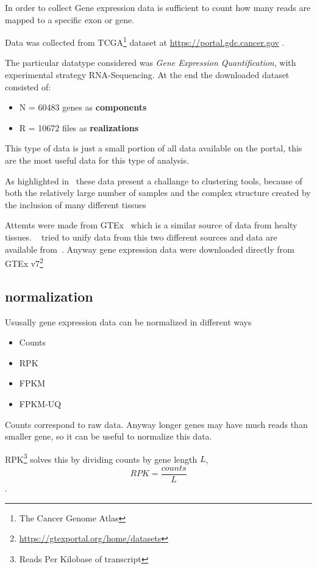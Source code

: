 In order to collect Gene expression data is sufficient to count how many reads are mapped to a specific exon or gene.

Data was collected from TCGA\footnote{The Cancer Genome Atlas} dataset at \url{https://portal.gdc.cancer.gov} \cite{grossman2016toward}.

The particular datatype considered was \textit{Gene Expression Quantification}, with experimental strategy RNA-Sequencing. 
At the end the downloaded dataset consisted of:
\begin{itemize}
\item N = 60483 genes as \textbf{components}
\item R = 10672 files as \textbf{realizations}
\end{itemize}

This type of data is just a small portion of all data available on the portal, this are the most useful data for this type of analysis.

As highlighted in~\cite{dey2017visualizing} these data present a challange to clustering tools, 
because of both the relatively large number of samples and the complex structure created by the inclusion of many different tissues

Attemts were made from GTEx~\cite{Betel2018} which is a similar source of data from healty tissues. 
~\cite{Wang2017} tried to unify data from this two different sources and data 
are available from~\cite{carithers2015novel}. Anyway gene expression data were 
downloaded directly from GTEx v7\footnote{\url{https://gtexportal.org/home/datasets}}


\subsection{normalization}
Ususally gene expression data can be normalized in different ways
\begin{itemize}
\item Counts
\item RPK
\item FPKM
\item FPKM-UQ
\end{itemize}

Counts correspond to raw data. 
Anyway longer genes may have much reads than smaller gene, so it can be useful to normalize this data. 

RPK\footnote{Reads Per Kilobase of transcript} solves this by dividing counts by 
gene length $L$, \[RPK=\frac{counts}{L}\].

